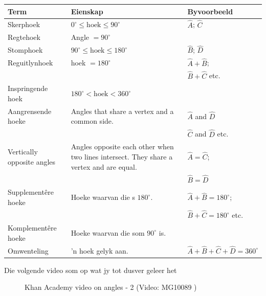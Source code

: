 \begin{table}[H]
\begin{center}
\begin{tabular}{|l|p{4cm}|l|} \hline
Term & Eienskap & Byvoorbeeld \\ \hline
Skerphoek & $0^{\circ} \leq \mbox{hoek} \leq 90^{\circ}$ & $\hat{A}$; $\hat{C}$ \\ \hline
Regtehoek & Angle $= 90^{\circ}$ &  \\ \hline
Stomphoek & $90^{\circ} \leq \mbox{hoek} \leq 180^{\circ}$ & $\hat{B}$; $\hat{D}$ \\ \hline
Reguitlynhoek & hoek $= 180^{\circ}$ & $\hat{A} + \hat{B}$;  \\
& & $\hat{B} + \hat{C}$ etc.  \\ \hline
Inspringende hoek & $180^{\circ} < \mbox{hoek} < 360^{\circ}$ &  \\ \hline
Aangrensende hoeke & Angles that share a vertex and a common side. & $\hat{A}$ and $\hat{D}$ \\ 
& & $\hat{C}$ and $\hat{D}$ etc. \\ \hline
Vertically opposite angles & Angles opposite each other when two lines intersect. They share a vertex and are equal. & $\hat{A}=\hat{C}$;\\
 &  & $\hat{B}=\hat{D}$\\ \hline
Supplementêre hoeke & Hoeke waarvan die s $180^{\circ}$. & $\hat{A}+\hat{B}=180^{\circ}$;\\ 
& & $\hat{B}+\hat{C}=180^{\circ}$ etc. \\ \hline
Komplementêre hoeke  & Hoeke waarvan die som  $90^{\circ}$ is. & \\ \hline
Omwenteling & 'n hoek gelyk aan. &  $\hat{A}+\hat{B}+\hat{C}+\hat{D}=360^{\circ}$ \\ \hline

\end{tabular}
\end{center}
\end{table}


Die volgende video som op wat jy tot dusver geleer het
\setcounter{subfigure}{0}
\begin{figure}[H] %
\textnormal{Khan Academy video on angles - 2}\vspace{.1in} \nopagebreak
\label{m39370*yt-media2}\label{m39370*yt-video2}
 { (Video:  MG10089 )}
\vspace{2pt}
\vspace{.1in}
\end{figure}       \par 

